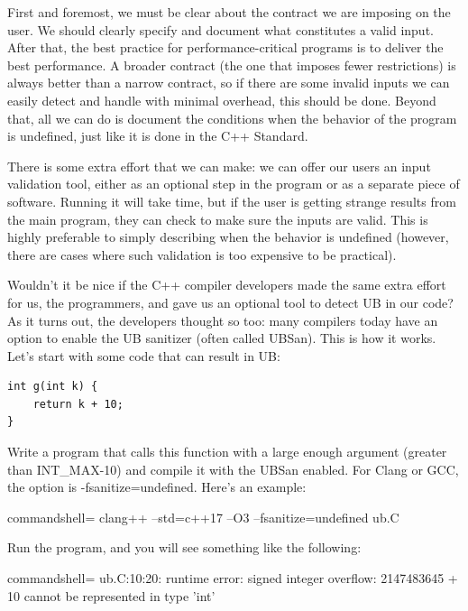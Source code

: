 First and foremost, we must be clear about the contract we are imposing on the user. We should clearly specify and document what constitutes a valid input. After that, the best practice for performance-critical programs is to deliver the best performance. A broader contract (the one that imposes fewer restrictions) is always better than a narrow contract, so if there are some invalid inputs we can easily detect and handle with minimal overhead, this should be done. Beyond that, all we can do is document the conditions when the behavior of the program is undefined, just like it is done in the C++ Standard. 

There is some extra effort that we can make: we can offer our users an input validation tool, either as an optional step in the program or as a separate piece of software. Running it will take time, but if the user is getting strange results from the main program, they can check to make sure the inputs are valid. This is highly preferable to simply describing when the behavior is undefined (however, there are cases where such validation is too expensive to be practical).

Wouldn't it be nice if the C++ compiler developers made the same extra effort for us, the programmers, and gave us an optional tool to detect UB in our code? As it turns out, the developers thought so too: many compilers today have an option to enable the UB sanitizer (often called UBSan). This is how it works. Let's start with some code that can result in UB:

\begin{lstlisting}[style=styleCXX]
int g(int k) {
	return k + 10;
}

\end{lstlisting}

Write a program that calls this function with a large enough argument (greater than INT\_MAX-10) and compile it with the UBSan enabled. For Clang or GCC, the option is -fsanitize=undefined. Here's an example:

\begin{tcblisting}{commandshell={}}
clang++ --std=c++17 –O3 –fsanitize=undefined ub.C
\end{tcblisting}

Run the program, and you will see something like the following:

\begin{tcblisting}{commandshell={}}
ub.C:10:20: runtime error: signed integer overflow: 
        2147483645 + 10 cannot be represented in type 'int'
\end{tcblisting}

